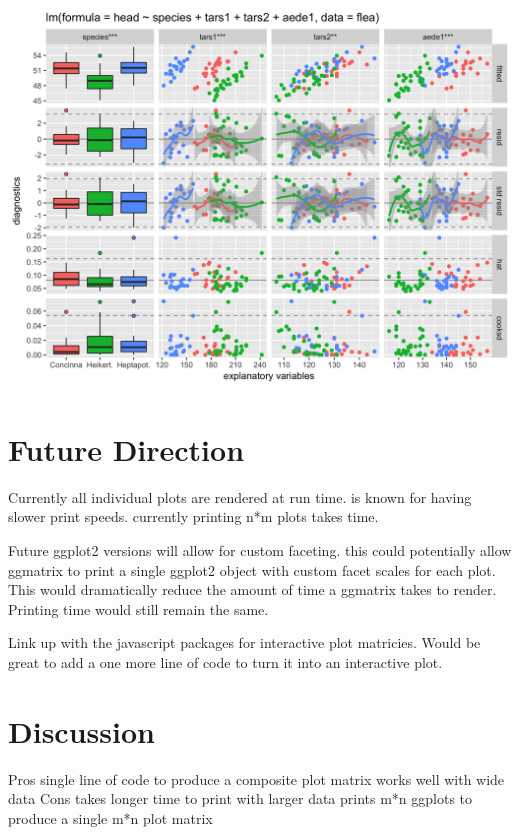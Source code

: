 \documentclass[article]{jss}
\begin{document}
\includegraphics{imgs/ggnostic_complex.png}








\section[Future Direction]{Future Direction}
Currently all individual plots are rendered at run time.   is known for having slower print speeds.
currently printing n*m plots takes time.

Future ggplot2 versions will allow for custom faceting.  this could potentially allow ggmatrix to print a single ggplot2 object with custom facet scales for each plot.  This would dramatically reduce the amount of time a ggmatrix takes to render.  Printing time would still remain the same.

Link up with the javascript packages for interactive plot matricies. Would be great to add a one more line of code to turn it into an interactive plot.


\section[Discussion]{Discussion}
Pros
  single line of code to produce a composite plot matrix
  works well with wide data
Cons
  takes longer time to print with larger data
  prints m*n ggplots to produce a single m*n plot matrix
\end{document}
